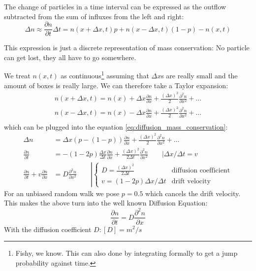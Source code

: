 The change of particles in a time interval can be expressed as the outflow subtracted from the sum of influxes from the left and right:
\begin{equation}
	\Delta n \approx \frac{\partial n}{\partial t}\Delta t = n(x+\Delta x,t)p + n(x-\Delta x, t)(1-p)-n(x,t)
	\label{eq:diffusion_mass_conservation}
\end{equation}

This expression is just a discrete representation of mass conservation: No particle can get lost, they all have to go somewhere.

We treat $n(x,t)$ as continuous\footnote{Fishy, we know. This can also done by integrating formally to get a jump probability against time.} assuming that $\Delta x$s are really small and the amount of boxes is really large. We can therefore take a Taylor expansion:
\begin{equation*}
	\begin{split}
		n(x+\Delta x,t) = n(x)+\Delta x \frac{\partial n}{\partial x} + \frac{(\Delta x)^2}2 \frac{\partial ^2 n}{\partial x^2} + \dots \\
		n(x-\Delta x,t) = n(x)-\Delta x \frac{\partial n}{\partial x} + \frac{(\Delta x)^2}2 \frac{\partial ^2 n}{\partial x^2} + \dots \\
	\end{split}
\end{equation*}
which can be plugged into the equation \eqref{eq:diffusion_mass_conservation}:
\begin{equation*}
	\begin{split}
		\Delta n  &= \Delta x(p - (1-p))\frac{\partial n}{\partial x} + \frac{(\Delta x)^2}2\frac{\partial^2 n}{\partial x^2}+ \dots\\
		\frac{\partial n}{\partial t} &= -(1-2p)\frac{\Delta x}{\Delta t} \frac{\partial n}{\partial x} + \frac{(\Delta x)^2}{2\Delta t} \frac{\partial ^2 n}{\partial x^2}\qquad \left | \Delta x/ \Delta  t = v \right.\\
		\frac{\partial n}{\partial t} + v \frac{\partial n}{\partial x} &= D\frac{\partial ^2 n}{\partial x^2} \qquad \left | 
		\begin{cases}D = \frac{(\Delta x)^2}{2\Delta t} & \text{diffusion coefficient}\\ v=  (1-2p)\Delta x/\Delta t& \text{drift velocity}\end{cases}
		\right .
	\end{split}
\end{equation*}
For an unbiased random walk we pose $p=0.5$ which cancels the drift velocity. This makes the above turn into the well known Diffusion Equation:
\begin{equation}
	\boxed{\frac{\partial n}{\partial t} = D\frac{\partial ^2 n}{\partial x}}
	\label{eq:diffusion_1d}
\end{equation}
With the diffusion coefficient $D: [D]=m^2/s$

